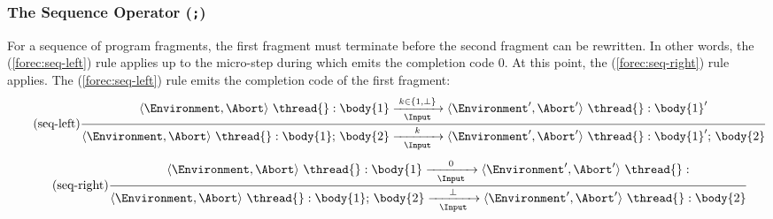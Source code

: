 \subsubsection{The Sequence Operator (\texttt{;})}
For a sequence of program fragments, the first fragment 
must terminate before the second fragment  can be rewritten. 
In other words, the (\ref{forec:seq-left}) rule applies up to
the micro-step during which  emits the completion 
code $0$. At this point, the (\ref{forec:seq-right}) rule applies.
The (\ref{forec:seq-left}) rule emits the completion code of 
the first fragment:
\begin{equation*}
	\tag{seq-left}
	\label{forec:seq-left}
	\frac{
			\langle \Environment, \Abort \rangle ~ \thread{}:\body{1}
				\xrightarrow[~~\Input~~]{k \in \lbrace 1, \bot \rbrace}
			\langle \Environment', \Abort' \rangle ~ \thread{}:\body{1}'
		}{
			\langle \Environment, \Abort \rangle ~ \thread{}:\body{1}\mathtt{;}~\body{2}
				\xrightarrow[~~\Input~~]{k} 
			\langle \Environment', \Abort' \rangle ~ \thread{}:\body{1}'\mathtt{;}~\body{2}
		}
\end{equation*}
\begin{equation*}
	\tag{seq-right}
	\label{forec:seq-right}
	\frac{
			\langle \Environment, \Abort \rangle ~ \thread{}:\body{1}
				\xrightarrow[~~\Input~~]{0}
			\langle \Environment', \Abort' \rangle ~ \thread{}:
		}{
			\langle \Environment, \Abort \rangle ~ \thread{}:\body{1}\mathtt{;}~\body{2}
				\xrightarrow[~~\Input~~]{\bot}
			\langle \Environment', \Abort' \rangle ~ \thread{}:\body{2}
		}
\end{equation*}

